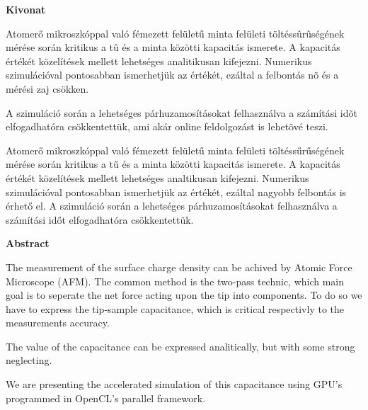 \clearpage
\begin{center}
\large
\textbf{Kivonat}
\end{center}

Atomerő mikroszkóppal való fémezett felületű minta felületi töltéssûrûségének mérése során kritikus a tû és a minta közötti kapacitás ismerete.
A kapacitás értékét közelítések mellett lehetséges analitikusan kifejezni.
Numerikus szimulációval pontosabban ismerhetjük az értékét, ezáltal a felbontás nõ és a mérési zaj csökken.

A szimuláció során a lehetséges párhuzamosításokat felhasználva a számítási idõt elfogadhatóra csökkentettük,
ami akár online feldolgozást is lehetõvé teszi.

Atomerő mikroszkóppal való fémezett felületű minta felületi töltéssűrűségének
mérése során kritikus a tű és a minta közötti kapacitás ismerete.
A kapacitás értékét közelítések mellett lehetséges analtikusan kifejezni.
Numerikus szimulációval pontosabban ismerhetjük az értékét, ezáltal nagyobb
felbontás is érhető el.
A szimuláció során a lehetséges párhuzamosításokat felhasználva a számítási időt
elfogadhatóra csökkentettük.


\clearpage
\begin{center}
\large
\textbf{Abstract}
\end{center}

The measurement of the surface charge density can be achived by Atomic Force Microscope (AFM).
The common method is the two-pass technic, which main goal is to seperate the net force acting upon the tip into components.
To do so we have to express the tip-sample capacitance, which is critical respectivly to the measurements accuracy.

The value of the capacitance can be expressed analitically, but with some strong neglecting.

We are presenting the accelerated simulation of this capacitance using GPU's programmed in
OpenCL's parallel framework.
